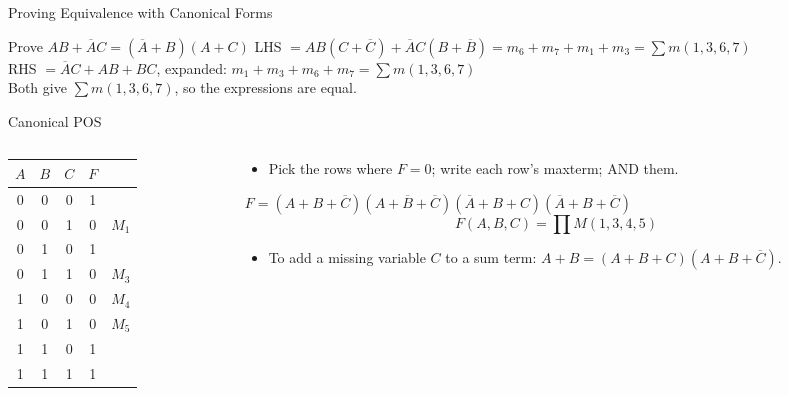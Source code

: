 \documentclass[9pt,aspectratio=169,xcolor=table]{beamer}
\begin{document}
\begin{frame}{Proving Equivalence with Canonical Forms}
  \begin{block}{Prove $AB + \overline{A}C = (\overline{A}+B)(A+C)$}
    \small
    LHS $= AB(C+\overline{C}) + \overline{A}C(B+\overline{B}) = m_6 + m_7 + m_1 + m_3 = \sum m(1,3,6,7)$\\[2mm]
    RHS $= \overline{A}C + AB + BC$, expanded: $m_1 + m_3 + m_6 + m_7 = \sum m(1,3,6,7)$\\[2mm]
    Both give $\sum m(1,3,6,7)$, so the expressions are equal.
  \end{block}
\end{frame}

\begin{frame}{Canonical POS}
  \begin{columns}[c]
  \begin{column}{.4\textwidth}
    \centering\small
    \begin{tabular}{ccc|cl}
      \toprule
      $A$ & $B$ & $C$ & $F$ & \\
      \midrule
      0 & 0 & 0 & 1 & \\
      0 & 0 & 1 & 0 & $M_1$ \\
      0 & 1 & 0 & 1 & \\
      0 & 1 & 1 & 0 & $M_3$ \\
      1 & 0 & 0 & 0 & $M_4$ \\
      1 & 0 & 1 & 0 & $M_5$ \\
      1 & 1 & 0 & 1 & \\
      1 & 1 & 1 & 1 & \\
      \bottomrule
    \end{tabular}
  \end{column}
  \begin{column}{.58\textwidth}
    \begin{itemize}\small\itemsep3pt
      \item Pick the rows where $F = 0$; write each row's maxterm; AND them.
    \end{itemize}
    \small
    $F = (A+B+\overline{C})(A+\overline{B}+\overline{C})(\overline{A}+B+C)(\overline{A}+B+\overline{C})$
    \[ F(A,B,C) = \prod M(1,3,4,5) \]
    \begin{itemize}\small
      \item To add a missing variable $C$ to a sum term: $A + B = (A+B+C)(A+B+\overline{C})$.
    \end{itemize}
  \end{column}
  \end{columns}
\end{frame}
\end{document}
